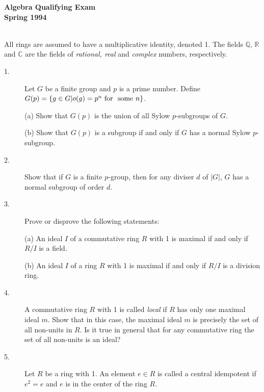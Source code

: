 \documentclass{article}
\def\R{\mathbb R}
\def\C{\mathbb C}
\def\Q{\mathbb Q}
\begin{document}


\begin{center}\begin{LARGE}
{\bf Algebra Qualifying Exam}\\ 
{\bf Spring 1994}\\ \end{LARGE}
\end{center}
\vspace{0.1in}
\noindent\hrulefill\\
All rings are assumed to have a multiplicative identity, denoted 1.
The fields $\Q$, $\R$ and $\C$ are the fields of
{\it rational, real} and {\it complex} numbers, respectively.

\begin{description}

\item[1.]
Let $G$ be a finite group and $p$ is a prime number. Define
$G(p) = \{g \in G| o(g) = p^n \hbox{\ for\ } \hbox{\ some\ } n\}$.

\item[\quad] (a)
Show that $G(p)$ is the union of all Sylow $p$-subgroups of $G$.

\item[\quad] (b)
Show that $G(p)$ is a subgroup if and only if $G$ has a normal Sylow
$p$-subgroup.

\item[2.]
Show that if $G$ is a finite $p$-group, then for any diviser $d$ of $|G|$,
$G$ has a normal subgroup of order $d$.

\item[3.]
Prove or disprove the following statements:

\item[\quad] (a)
An ideal $I$ of a commutative ring $R$ with 1 is maximal if and only if
$R/I$ is a field.

\item[\quad] (b)
An ideal $I$ of a ring $R$ with 1 is maximal if and only if $R/I$ is
a division ring.

\item[4.]
A commutative ring $R$ with 1 is called {\it local} if $R$ has only one
maximal ideal $m$. Show that in this case, the maximal ideal $m$ is
precisely the set of all non-units in $R$. Is it true in general that for
any commutative ring the set of all non-units is an ideal?

\item[5.]
Let $R$ be a ring with 1. An element $e \in R$ is called a central idempotent
if $e^2=e$ and $e$ is in the center of the ring $R$.


\end{description}
\end{document}
